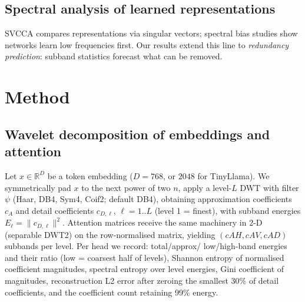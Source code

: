 \documentclass[conference]{IEEEtran}
\begin{document}
\subsection{Spectral analysis of learned representations}
SVCCA \cite{raghu2017svcca} compares representations via singular
vectors; spectral bias studies \cite{rahaman2019spectral} show networks
learn low frequencies first. Our results extend this line to
\emph{redundancy prediction}: subband statistics forecast what can be
removed.

\section{Method}
\subsection{Wavelet decomposition of embeddings and attention}
Let $x\in\mathbb{R}^{D}$ be a token embedding ($D{=}768$, or $2048$ for
TinyLlama). We symmetrically pad $x$ to the next power of two $n$, apply
a level-$L$ DWT with filter $\psi$ (Haar, DB4, Sym4, Coif2; default DB4),
obtaining approximation coefficients $c_A$ and detail coefficients
$c_{D,\ell}$, $\ell=1..L$ (level 1 = finest), with subband energies
$E_\ell=\lVert c_{D,\ell}\rVert^2$. Attention matrices receive the same
machinery in 2-D (separable DWT2) on the row-normalised matrix, yielding
$(cAH,cAV,cAD)$ subbands per level. Per head we record: total/approx/
low/high-band energies and their ratio (low = coarsest half of levels),
Shannon entropy of normalised coefficient magnitudes, spectral entropy
over level energies, Gini coefficient of magnitudes, reconstruction L2
error after zeroing the smallest 30\% of detail coefficients, and the
coefficient count retaining 99\% energy.
\end{document}
